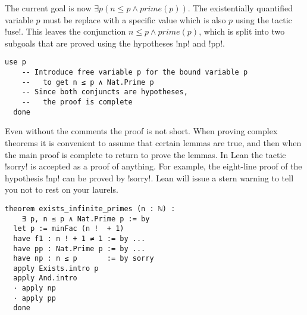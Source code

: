 The current goal is now $\exists p( n \leq p \wedge \mathit{prime}(p))$. The existentially quantified variable $p$ must be replace with a specific value which is also $p$ using the tactic !use!.  This leaves the conjunction $n \leq p \wedge \mathit{prime}(p)$, which is split into two subgoals that are proved using the hypotheses !np! and !pp!.

\begin{Verbatim}[firstnumber=last]
  use p
    -- Introduce free variable p for the bound variable p
    --   to get n ≤ p ∧ Nat.Prime p
    -- Since both conjuncts are hypotheses,
    --   the proof is complete
  done
\end{Verbatim}


Even without the comments the proof is not short. When proving complex theorems it is convenient to assume that certain lemmas are true, and then when the main proof is complete to return to prove the lemmas. In Lean the tactic !sorry! is accepted as a proof of anything. For example, the eight-line proof of the hypothesis !np! can be proved by !sorry!. Lean will issue a stern warning to tell you not to rest on your laurels.

\vspace{-2ex}

\begin{Verbatim}[numbers=none]
theorem exists_infinite_primes (n : ℕ) : 
    ∃ p, n ≤ p ∧ Nat.Prime p := by
  let p := minFac (n !  + 1)
  have f1 : n ! + 1 ≠ 1 := by ...
  have pp : Nat.Prime p := by ...
  have np : n ≤ p       := by sorry
  apply Exists.intro p
  apply And.intro
  · apply np
  · apply pp
  done
\end{Verbatim}


